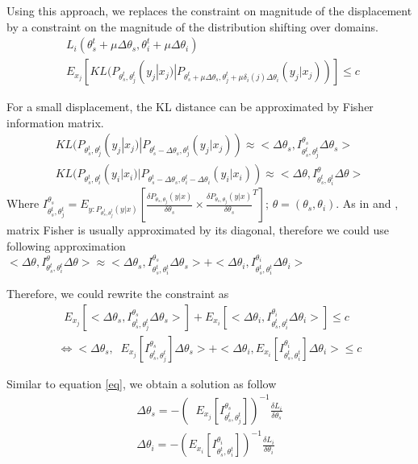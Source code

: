 \documentclass[12pt,times,a4paper,twoside]{article}
\theoremstyle{definition}
\DeclareMathOperator*{\argmax}{argmax}
\begin{document}
Using this approach, we replaces the constraint on magnitude of the displacement by a constraint on the magnitude of the distribution shifting over domains.
\begin{align}
	\displaystyle{\mathop{\argmax_{\Delta \theta}} L_i(\theta_s^t + \mu \Delta \theta_s, \theta_i^t + \mu \Delta \theta_i)} \\
	\mathop{\sum_{j=1}^{T}} E_{x_j}[KL(P_{\theta^t_s, \theta^t_j}(y_j|x_j)|P_{\theta^t_s + \mu \Delta \theta_s, \theta^t_j + \mu \delta_{i}(j) \Delta \theta_i}(y_j|x_j))] \leq c \nonumber
\end{align}

For a small displacement, the KL distance can be approximated by Fisher information matrix.
\begin{align}
KL(P_{\theta^t_s, \theta^t_j}(y_j|x_j)|P_{\theta^t_s - \Delta \theta_s, \theta^t_j}(y_j|x_j)) \approx <\Delta \theta_s , I_{\theta^t_s, \theta^t_j}^{\theta_s} \Delta \theta_s > \\
KL(P_{\theta^t_s, \theta^t_i}(y_i|x_i)|P_{\theta^t_s - \Delta \theta_s, \theta^t_i - \Delta \theta_i}(y_i|x_i)) \approx <\Delta \theta , I_{\theta^t_s, \theta^t_i}^{\theta} \Delta \theta >
\end{align}
Where $I_{\theta^t_s, \theta^t_j}^{\theta_s} = E_{y:P_{\theta^t_s, \theta^t_j}(y|x)}[\frac{\delta P_{\theta_s, \theta_j}(y|x)}{\delta \theta_s} \times \frac{\delta P_{\theta_s, \theta_j}(y|x)}{\delta \theta_s}^T]$; $\theta = (\theta_s, \theta_i)$. As in \citet{Thompson19overcoming} and \citet{Kirkpatrick17overcoming}, matrix Fisher is usually approximated by its diagonal, therefore we could use following approximation $<\Delta \theta , I_{\theta^t_s, \theta^t_i}^{\theta} \Delta \theta > \approx <\Delta \theta_s , I_{\theta^t_s, \theta^t_i}^{\theta_s} \Delta \theta_s > + <\Delta \theta_i , I_{\theta^t_s, \theta^t_i}^{\theta_i} \Delta \theta_i >$

Therefore, we could rewrite the constraint as
\begin{align}
\mathop{\sum_{j=1}^{T}}  E_{x_j}[<\Delta \theta_s , I_{\theta^t_s, \theta^t_j}^{\theta_s} \Delta \theta_s >] + E_{x_i}[<\Delta \theta_i , I_{\theta^t_s, \theta^t_i}^{\theta_i} \Delta \theta_i >] \leq  c \\
\Longleftrightarrow <\Delta \theta_s , \mathop{\sum_{j=1}^{T}}  E_{x_j}[I_{\theta^t_s, \theta^t_j}^{\theta_s}] \Delta \theta_s > + <\Delta \theta_i , E_{x_i}[I_{\theta^t_s, \theta^t_i}^{\theta_i}] \Delta \theta_i > \leq c 
\end{align} 

Similar to equation \ref{eq}, we obtain a solution as follow 
\begin{align}
\Delta \theta_s = -(\mathop{\sum_{j=1}^{T}}  E_{x_j}[I_{\theta^t_s, \theta^t_j}^{\theta_s}])^{-1}\frac{\delta L_i}{\delta \theta_s} \\
\Delta \theta_i = -(E_{x_i}[I_{\theta^t_s, \theta^t_i}^{\theta_i}])^{-1}\frac{\delta L_i}{\delta \theta_i}
\end{align}



\end{document}
